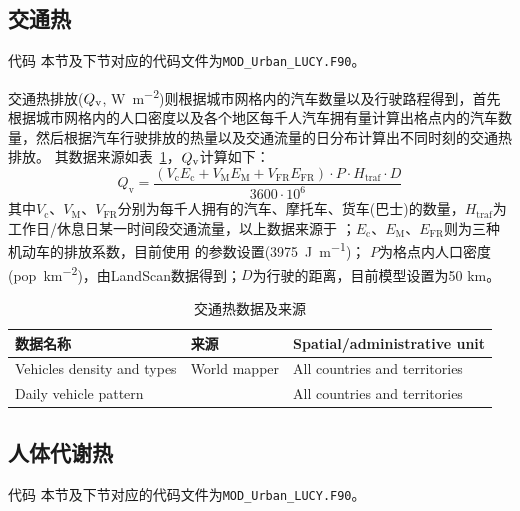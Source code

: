\subsection{交通热}
\begin{mymdframed}{代码}
  本节及下节对应的代码文件为\texttt{MOD\_Urban\_LUCY.F90}。
\end{mymdframed}

交通热排放($Q_{\rm v}$, \unit{W.m^{-2}})则根据城市网格内的汽车数量以及行驶路程得到，首先根据城市网格内的人口密度以及各个地区每千人汽车拥有量计算出格点内的汽车数量，然后根据汽车行驶排放的热量以及交通流量的日分布计算出不同时刻的交通热排放。
其数据来源如表~\ref{tab:交通热数据及来源}，$Q_{\rm v}$计算如下：
\begin{equation}
  Q_{\mathrm{v}}=\frac{\left(V_{\mathrm{c}} E_{\mathrm{c}}+V_{\mathrm{M}} E_{\mathrm{M}}+V_{\mathrm{F R}} E_{\mathrm{FR}}\right)  \cdot P \cdot H_{\mathrm{traf}} \cdot D}{3600 \cdot 10^{6}}
\end{equation}
其中$V_{\mathrm {c}}$、$V_{\mathrm {M}}$、$V_{\mathrm{FR}}$分别为每千人拥有的汽车、摩托车、货车(巴士)的数量，$H_{\mathrm{traf}}$为工作日/休息日某一时间段交通流量，以上数据来源于 \citet{allen2011}；$E_{\mathrm {c}}$、$E_{\mathrm {M}}$、$E_{\mathrm{FR}}$则为三种机动车的排放系数，目前使用 \citet{sailor2004top} 的参数设置(\qty{3975}{J.m^{-1}})；
$P$为格点内人口密度 (\unit{pop.km^{-2}})，由LandScan数据得到；$D$为行驶的距离，目前模型设置为50 km。

\begin{table}[htbp]
  \centering
  \caption{交通热数据及来源}\label{tab:交通热数据及来源}
  \begin{tabular}{@{}lll@{}}
    \toprule
    数据名称                   & 来源                   & Spatial/administrative unit   \\ \midrule
    Vehicles density and types & World mapper           & All countries and territories \\
    Daily vehicle pattern      & \citet{Hallenbeck1997} & All countries and territories \\ \bottomrule
  \end{tabular}
\end{table}

\subsection{人体代谢热}

\begin{mymdframed}{代码}
  本节及下节对应的代码文件为\texttt{MOD\_Urban\_LUCY.F90}。
\end{mymdframed}

